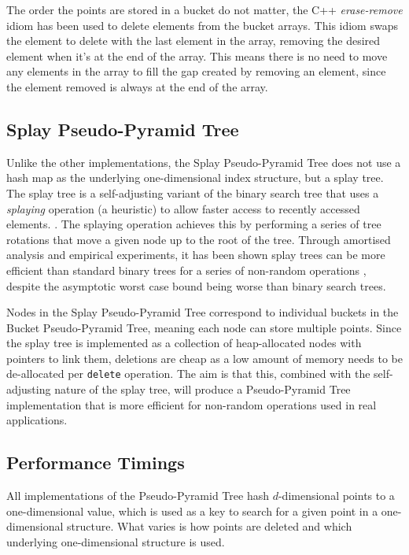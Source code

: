 The order the points are stored in a bucket do not matter, the C++ \textit{erase-remove} idiom has been used to delete elements from the bucket arrays. This idiom swaps the element to delete with the last element in the array, removing the desired element when it's at the end of the array. This means there is no need to move any elements in the array to fill the gap created by removing an element, since the element removed is always at the end of the array.

\subsection{Splay Pseudo-Pyramid Tree}

Unlike the other implementations, the Splay Pseudo-Pyramid Tree does not use a hash map as the underlying one-dimensional index structure, but a splay tree. The splay tree is a self-adjusting variant of the binary search tree that uses a \textit{splaying} operation (a heuristic) to allow faster access to recently accessed elements. \cite{splay-tree}. The splaying operation achieves this by performing a series of tree rotations that move a given node up to the root of the tree. Through amortised analysis and empirical experiments, it has been shown splay trees can be more efficient than standard binary trees for a series of non-random operations \cite{splay-tree}, despite the asymptotic worst case bound being worse than binary search trees.

Nodes in the Splay Pseudo-Pyramid Tree correspond to individual buckets in the Bucket Pseudo-Pyramid Tree, meaning each node can store multiple points. Since the splay tree is implemented as a collection of heap-allocated nodes with pointers to link them, deletions are cheap as a low amount of memory needs to be de-allocated per \texttt{delete} operation. The aim is that this, combined with the self-adjusting nature of the splay tree, will produce a Pseudo-Pyramid Tree implementation that is more efficient for non-random operations used in real applications.

\subsection{Performance Timings}

All implementations of the Pseudo-Pyramid Tree hash $d$-dimensional points to a one-dimensional value, which is used as a key to search for a given point in a one-dimensional structure. What varies is how points are deleted and which underlying one-dimensional structure is used.

